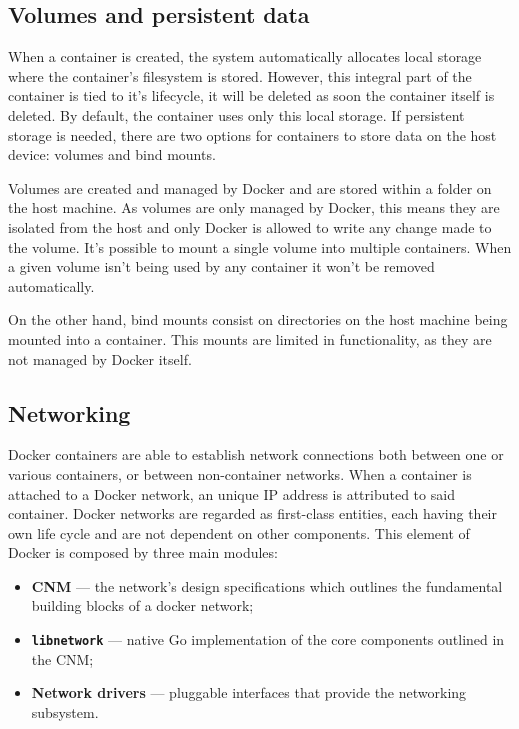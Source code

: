 



\subsection{Volumes and persistent data}
\label{sec::arch:volumes}

When a container is created, the system automatically allocates local storage where the container's filesystem is stored. However, this integral part of the container is tied to it's lifecycle, it will be deleted as soon the container itself is deleted. By default, the container uses only this local storage. If persistent storage is needed, there are two options for containers to store data on the host device: volumes and bind mounts\cite{container-storage}.

Volumes are created and managed by Docker and are stored within a folder on the host machine. As volumes are only managed by Docker, this means they are isolated from the host and only Docker is allowed to write any change made to the volume. It's possible to mount a single volume into multiple containers. When a given volume isn't being used by any container it won't be removed automatically.

On the other hand, bind mounts consist on directories on the host machine being mounted into a container. This mounts are limited in functionality, as they are not managed by Docker itself.



\subsection{Networking}
\label{ssec::arch:net}

Docker containers are able to establish network connections both between one or various containers, or between non-container networks. When a container is attached to a Docker network, an unique \acs{IP} address is attributed to said container. Docker networks are regarded as first-class entities, each having their own life cycle and are not dependent on other components. This element of Docker is composed by three main modules:

\begin{itemize}
    \item \textbf{\ac{CNM}} --- the network's design specifications which outlines the fundamental building blocks of a docker network;
    \item \textbf{\texttt{libnetwork}} --- native Go implementation of the core components outlined in the \ac{CNM};
    \item \textbf{Network drivers} --- pluggable interfaces that provide the networking subsystem.
\end{itemize}


